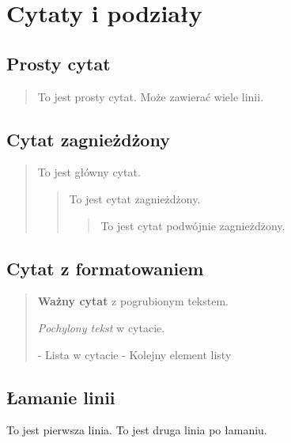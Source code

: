 \documentclass{article}
\begin{document}
\section{Cytaty i podziały}



\subsection{Prosty cytat}



\begin{quote}
To jest prosty cytat.
Może zawierać wiele linii.
\end{quote}



\subsection{Cytat zagnieżdżony}



\begin{quote}
To jest główny cytat.
\begin{quote}
To jest cytat zagnieżdżony.
\begin{quote}
To jest cytat podwójnie zagnieżdżony.
\end{quote}

\end{quote}

\end{quote}



\subsection{Cytat z formatowaniem}



\begin{quote}
\textbf{Ważny cytat} z pogrubionym tekstem.

\textit{Pochylony tekst} w cytacie.

- Lista w cytacie
- Kolejny element listy
\end{quote}



\subsection{Łamanie linii}



To jest pierwsza linia.  
To jest druga linia po łamaniu.
\end{document}
